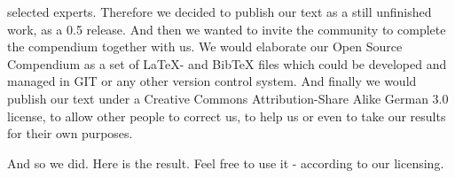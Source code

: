 \begin{description}
  selected experts. Therefore we decided to publish our text as a still
  unfinished work, as a 0.5 release. And then we wanted to invite the community
  to complete the compendium together with us. We would elaborate our Open
  Source Compendium as a set of LaTeX- and BibTeX files which could be developed
  and managed in GIT or any other version control system. And finally we would
  publish our text under a Creative Commons Attribution-Share Alike German 3.0
  license, to allow other people to correct
  us, to help us or even to take our results for their own purposes.
\end{description}

And so we did. Here is the result. Feel free to use it - according to our
licensing.

%
